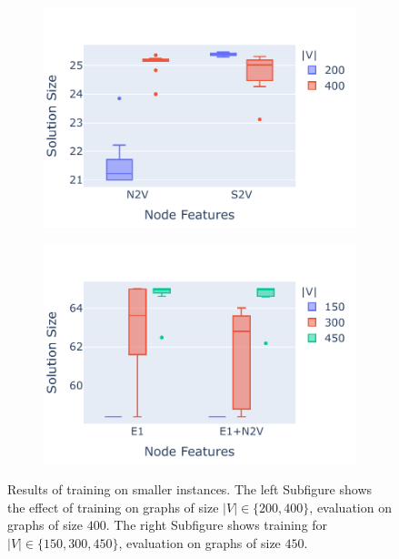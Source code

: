\documentclass[draft,final]{vutinfth} %
\begin{document}
\begin{figure}
    \centering
    \begin{subfigure}{0.49\textwidth}
        \centering
        \includegraphics[width=\textwidth]{graphics/generalization-1.pdf}
    \end{subfigure}
    \begin{subfigure}{0.49\textwidth}
        \centering
        \includegraphics[width=\textwidth]{graphics/generalization-2.pdf}
    \end{subfigure}
    \caption{Results of training on smaller instances. The left Subfigure shows the effect of training on graphs of size $|V| \in \{200, 400\}$, evaluation on graphs of size $400$. The right Subfigure shows training for $|V| \in \{150, 300, 450\}$, evaluation on graphs of size $450$.}
    \label{fig:generalization}
\end{figure}
\end{document}
